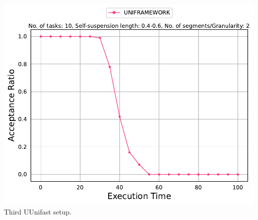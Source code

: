\documentclass[]{article}
\begin{document}
\begin{minipage}[t]{0.48\linewidth}
		\includegraphics[width=\linewidth]{UNIFRAMEWORK[2][0.4-0.6][10].pdf}
		Third UUnifast setup.
		\vspace{0.3cm}
		
		
	\end{minipage}\hfill
\end{document}
